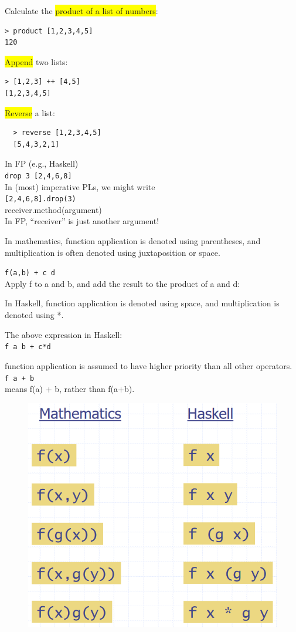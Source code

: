 \documentclass[tikz,border=10pt]{project_plan}
\begin{document}
Calculate the \colorbox{yellow}{product of a list of numbers}:
\begin{lstlisting}
> product [1,2,3,4,5]
120
\end{lstlisting}

\colorbox{yellow}{Append} two lists:
\begin{lstlisting}
> [1,2,3] ++ [4,5]
[1,2,3,4,5]
\end{lstlisting}

\colorbox{yellow}{Reverse} a list:
\begin{lstlisting}
  > reverse [1,2,3,4,5]
  [5,4,3,2,1]
\end{lstlisting}


In FP (e.g., Haskell)\\
\lstinline|drop 3 [2,4,6,8]|\\
In (most) imperative PLs, we might write\\
\lstinline|[2,4,6,8].drop(3)|\\
receiver.method(argument)\\

In FP, “receiver” is just another argument!


In mathematics, function application is denoted using
parentheses, and multiplication is often denoted using
juxtaposition or space.

\lstinline|f(a,b) + c d|\\
Apply f to a and b, and add the result to the product of a and d:

In Haskell, function application is denoted using space,
and multiplication is denoted using *.

The above expression in Haskell:\\
\lstinline|f a b + c*d|

function application is assumed to have higher priority than all other operators.\\
\lstinline|f a + b|\\
means f(a) + b, rather than f(a+b).

\begin{figure}[H]
  \centering
  \includegraphics*[width=.5\linewidth]{maths_v_haskell.png}
\end{figure}
\end{document}
